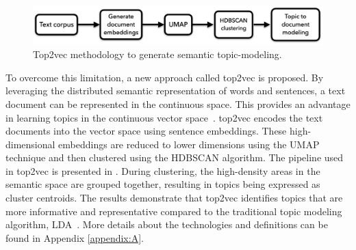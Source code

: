 \begin{figure}[h]
	\centering
	\includegraphics[width=.99\textwidth]{images/thesis_images/top2vec.png}
	\caption[Top2vec topic modeling.]{Top2vec methodology to generate semantic topic-modeling.   \label{fig:top2vec}}
\end{figure}

To overcome this limitation, a new approach called top2vec is proposed. By leveraging the distributed semantic representation of words and sentences, a text document can be represented in the continuous space. This provides an advantage in learning topics in the continuous vector space~\cite{angelov2020top2vec}. top2vec encodes the text documents into the vector space using sentence embeddings. These high-dimensional embeddings are reduced to lower dimensions using the \ac{UMAP} technique and then clustered using the \ac{HDBSCAN} algorithm. The pipeline used in top2vec is presented in . During clustering, the high-density areas in the semantic space are grouped together, resulting in topics being expressed as cluster centroids. The results demonstrate that top2vec identifies topics that are more informative and representative compared to the traditional topic modeling algorithm, \ac{LDA}~\cite{angelov2020top2vec}. More details about the technologies and definitions can be found in Appendix \ref{appendix:A}.








